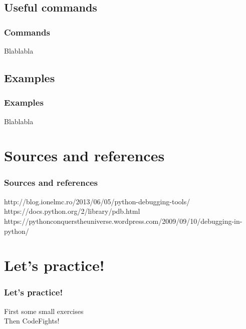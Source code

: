 \subsection{Useful commands}
\begin{frame}
\frametitle{Commands}	
Blablabla
\end{frame}

\subsection{Examples}
\begin{frame}
\frametitle{Examples}	
Blablabla
\end{frame}



\section{Sources and references}
\begin{frame}
\frametitle{Sources and references}	
http://blog.ionelmc.ro/2013/06/05/python-debugging-tools/
https://docs.python.org/2/library/pdb.html
https://pythonconquerstheuniverse.wordpress.com/2009/09/10/debugging-in-python/
\end{frame}



\section{Let's practice!}
\begin{frame}
\frametitle{Let's practice!}	
First some small exercises\\

Then CodeFights!
\end{frame}



\ThankYouFrame

